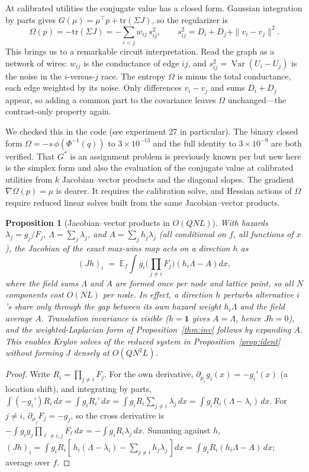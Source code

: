 \documentclass[12pt]{article}
\newtheorem{proposition}{Proposition}
\theoremstyle{remark}
\newcommand{\E}{\mathbb{E}}
\begin{document}
At calibrated utilities the conjugate value has a closed form. Gaussian
integration by parts gives
$G(\mu) = \mu^\top p + \mathrm{tr}(\Sigma J)$, so the regularizer is
\[
\Omega(p) = -\mathrm{tr}(\Sigma J)
= -\sum_{i<j} w_{ij}\, s_{ij}^2, \qquad
s_{ij}^2 = D_i + D_j + \|v_i - v_j\|^2 .
\]
This brings us to a remarkable circuit interpretation. Read the graph
as a network of wires: $w_{ij}$ is the conductance of
edge $ij$, and $s_{ij}^2 = \operatorname{Var}(U_i - U_j)$ is the noise in the
$i$-versus-$j$ race. The entropy $\Omega$ is minus the total
conductance, each edge weighted by its noise. Only differences $v_i -
v_j$ and sums $D_i + D_j$ appear, so adding a common part to the
covariance leaves $\Omega$ unchanged---the contrast-only property
again.

We checked this in the code (see experiment 27 in particular). The
binary closed form $\Omega = -s\,\phi(\Phi^{-1}(q))$ to
$3\times10^{-13}$ and the full identity to $3\times10^{-9}$ are both
verified. That $G^*$ is an assignment problem is previously known per
\citet{chiong2016} but new here is the simplex form and also the
evaluation of the conjugate value
at calibrated utilities from $k$ Jacobian--vector products and the
diagonal slopes. The gradient $\nabla\Omega(p) = \mu$ is dearer. It
requires the calibration solve, and Hessian actions of $\Omega$ require
reduced linear solves built from the same Jacobian--vector products.


\begin{proposition}[Jacobian--vector products in $O(QNL)$]\label{prop:jvp}
With hazards $\lambda_j = g_j / F_j$, $\Lambda = \sum_j \lambda_j$, and
$A = \sum_j h_j \lambda_j$ (all conditional on $f$, all functions of $x$),
the Jacobian of the exact max-wins map acts on a direction $h$ as
\[
(Jh)_i \;=\; \E_f \int g_i \Big(\prod_{j \ne i} F_j\Big)
\left( h_i \Lambda - A \right) dx ,
\]
where the field sums $\Lambda$ and $A$ are formed once per node and lattice
point, so all $N$ components cost $O(NL)$ per node. In effect, a direction
$h$ perturbs alternative $i$'s share only through the gap between its own
hazard weight $h_i \Lambda$ and the field average $A$. Translation
invariance is visible ($h = \mathbf{1}$ gives $A = \Lambda$, hence $Jh =
0$), and the weighted-Laplacian form of Proposition~\ref{thm:inv} follows by
expanding $A$.
This enables Krylov solves of the reduced system in
Proposition~\ref{prop:ident} without forming $J$ densely at $O(QN^2L)$.
\end{proposition}
\begin{proof}
Write $R_i = \prod_{j \ne i} F_j$. For the own derivative,
$\partial_{\mu_i} g_i(x) = -g_i'(x)$ (a location shift), and integrating by
parts, $\int (-g_i') R_i\,dx = \int g_i R_i' \,dx = \int g_i R_i
\sum_{j \ne i} \lambda_j\,dx = \int g_i R_i (\Lambda -
\lambda_i)\,dx$. For $j \ne i$, $\partial_{\mu_j} F_j = -g_j$, so the
cross derivative is $-\int g_i g_j \prod_{\ell \ne i,j} F_\ell\,dx =
-\int g_i R_i \lambda_j\,dx$. Summing against $h$,
$(Jh)_i = \int g_i R_i [\,h_i(\Lambda - \lambda_i) - \sum_{j \ne i}
h_j \lambda_j\,]dx = \int g_i R_i (h_i \Lambda - A)\,dx$; average over
$f$.
\end{proof}
\end{document}
